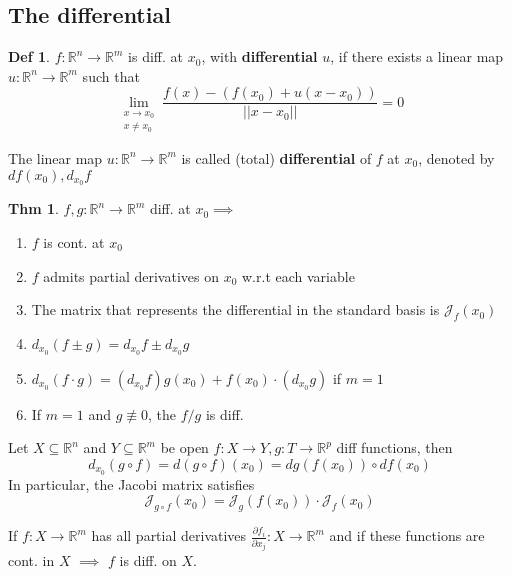 \documentclass[a4paper, 10pt]{article}
\theoremstyle{definition}
\newtheorem*{theorem}{Thm}
\newtheorem*{definition}{Def}
\newcommand{\R}{\mathbb{R}}
\newcommand{\J}{\mathcal{J}}
\begin{document}
\subsection{The differential}
\begin{definition}
    \(f: \R^n \to \R^m\) is diff. at \(x_0\), with \textbf{differential} \(u\), if there exists a linear map \(u: \R^n \to \R^m\) such that
    \[\lim_{\substack{x \to x_0 \\ x \neq x_0}} \frac{f(x) - (f(x_0) + u(x - x_0))}{||x-x_0||} = 0\]

    The linear map \(u: \R^n \to \R^m\) is called (total) \textbf{differential} of \(f\) at \(x_0\), denoted by \(df(x_0), d_{x_0}f\)
\end{definition}

\begin{theorem}
    \(f, g: \R^n \to \R^m\) diff. at \(x_0 \implies\)
    \begin{enumerate}
        \item \(f\) is cont. at \(x_0\)
        \item \(f\) admits partial derivatives on \(x_0\) w.r.t each variable
        \item The matrix that represents the differential in the standard basis is \(\J_f(x_0)\)
        \item \(d_{x_0}(f \pm g) = d_{x_0}f \pm d_{x_0}g\)
        \item \(d_{x_0}(f \cdot g) = (d_{x_0}f)g(x_0) + f(x_0) \cdot (d_{x_0} g)\) if \(m = 1\)
        \item If \(m = 1\) and \(g \not\equiv 0\), the \(f / g\) is diff.
    \end{enumerate}
\end{theorem}

\begin{ntheorem*}
    Let \(X \subseteq \R^n\) and \(Y \subseteq \R^m\) be open \(f: X \to Y, g: T \to \R^p\) diff functions, then
    \[d_{x_0}(g \circ f) = d(g \circ f)(x_0) = dg(f(x_0)) \circ df(x_0)\]
    In particular, the Jacobi matrix satisfies
    \[\J_{g \circ f}(x_0) = \J_g(f(x_0)) \cdot \J_f(x_0)\]
\end{ntheorem*}

\begin{ntheorem*}
    If \(f : X \to \R^m\) has all partial derivatives \(\frac{\partial f_i}{\partial x_j}: X \to \R^m\) and if these functions are cont. in \(X\) \(\implies\) \(f\) is diff. on \(X\).
\end{ntheorem*}
\end{document}

